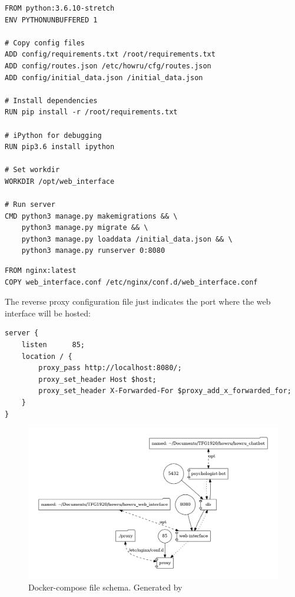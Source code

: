 \documentclass[12pt,english]{article}
\begin{document}
\begin{lstlisting}[language=docker, caption={HOW-R-U web interface Dockerfile}, captionpos=b]
FROM python:3.6.10-stretch
ENV PYTHONUNBUFFERED 1

# Copy config files
ADD config/requirements.txt /root/requirements.txt
ADD config/routes.json /etc/howru/cfg/routes.json
ADD config/initial_data.json /initial_data.json

# Install dependencies
RUN pip install -r /root/requirements.txt

# iPython for debugging
RUN pip3.6 install ipython

# Set workdir
WORKDIR /opt/web_interface

# Run server
CMD python3 manage.py makemigrations && \
    python3 manage.py migrate && \
    python3 manage.py loaddata /initial_data.json && \
    python3 manage.py runserver 0:8080
\end{lstlisting}

\begin{lstlisting}[language=docker, caption={HOW-R-U web reverse proxy Dockerfile}, captionpos=b]
FROM nginx:latest
COPY web_interface.conf /etc/nginx/conf.d/web_interface.conf
\end{lstlisting}

The reverse proxy configuration file just indicates the port where the web interface will be hosted:
\begin{lstlisting}[language=nginx, mathescape=false, caption={HOW-R-U web reverse proxy configuration file}, captionpos=b]
server {
    listen      85;
    location / {
        proxy_pass http://localhost:8080/;
        proxy_set_header Host $host;
        proxy_set_header X-Forwarded-For $proxy_add_x_forwarded_for;
    }
}
\end{lstlisting}

\begin{figure}[H]
  \centering
  \includegraphics[width=\textwidth]{docker-compose.png}
  \caption{Docker-compose file schema. Generated by \protect\cite{dockerviz}}
\end{figure}
\end{document}
